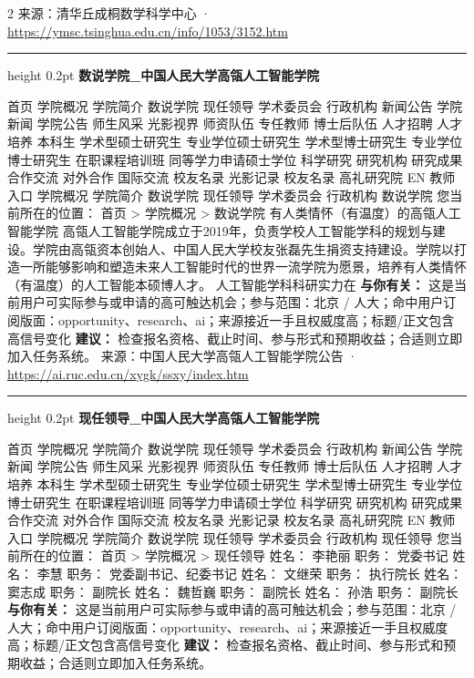 \documentclass[10.5pt]{ctexart}
\begin{document}
\begin{multicols}{2}
{\footnotesize\color{ormuted} 来源：清华丘成桐数学科学中心 · \url{https://ymsc.tsinghua.edu.cn/info/1053/3152.htm}}
\vspace{2mm}
\hrule height 0.2pt
\vspace{2mm}
{\large\bfseries 数说学院\_中国人民大学高瓴人工智能学院}\par
首页 学院概况 学院简介 数说学院 现任领导 学术委员会 行政机构 新闻公告 学院新闻 学院公告 师生风采 光影视界 师资队伍 专任教师 博士后队伍 人才招聘 人才培养 本科生 学术型硕士研究生 专业学位硕士研究生 学术型博士研究生 专业学位博士研究生 在职课程培训班 同等学力申请硕士学位 科学研究 研究机构 研究成果 合作交流 对外合作 国际交流 校友名录 光影记录 校友名录 高礼研究院 EN 教师入口 学院概况 学院简介 数说学院 现任领导 学术委员会 行政机构 数说学院 您当前所在的位置： 首页 > 学院概况 > 数说学院 有人类情怀（有温度）的高瓴人工智能学院 高瓴人工智能学院成立于2019年，负责学校人工智能学科的规划与建设。学院由高瓴资本创始人、中国人民大学校友张磊先生捐资支持建设。学院以打造一所能够影响和塑造未来人工智能时代的世界一流学院为愿景，培养有人类情怀（有温度）的人工智能本硕博人才。 人工智能学科科研实力在
\textbf{与你有关：} 这是当前用户可实际参与或申请的高可触达机会；参与范围：北京 / 人大；命中用户订阅版面：opportunity、research、ai；来源接近一手且权威度高；标题/正文包含高信号变化
\textbf{建议：} 检查报名资格、截止时间、参与形式和预期收益；合适则立即加入任务系统。
{\footnotesize\color{ormuted} 来源：中国人民大学高瓴人工智能学院公告 · \url{https://ai.ruc.edu.cn/xygk/ssxy/index.htm}}
\vspace{2mm}
\hrule height 0.2pt
\vspace{2mm}
{\large\bfseries 现任领导\_中国人民大学高瓴人工智能学院}\par
首页 学院概况 学院简介 数说学院 现任领导 学术委员会 行政机构 新闻公告 学院新闻 学院公告 师生风采 光影视界 师资队伍 专任教师 博士后队伍 人才招聘 人才培养 本科生 学术型硕士研究生 专业学位硕士研究生 学术型博士研究生 专业学位博士研究生 在职课程培训班 同等学力申请硕士学位 科学研究 研究机构 研究成果 合作交流 对外合作 国际交流 校友名录 光影记录 校友名录 高礼研究院 EN 教师入口 学院概况 学院简介 数说学院 现任领导 学术委员会 行政机构 现任领导 您当前所在的位置： 首页 > 学院概况 > 现任领导 姓名： 李艳丽 职务： 党委书记 姓名： 李慧 职务： 党委副书记、纪委书记 姓名： 文继荣 职务： 执行院长 姓名： 窦志成 职务： 副院长 姓名： 魏哲巍 职务： 副院长 姓名： 孙浩 职务： 副院长
\textbf{与你有关：} 这是当前用户可实际参与或申请的高可触达机会；参与范围：北京 / 人大；命中用户订阅版面：opportunity、research、ai；来源接近一手且权威度高；标题/正文包含高信号变化
\textbf{建议：} 检查报名资格、截止时间、参与形式和预期收益；合适则立即加入任务系统。

\end{multicols}
\end{document}
